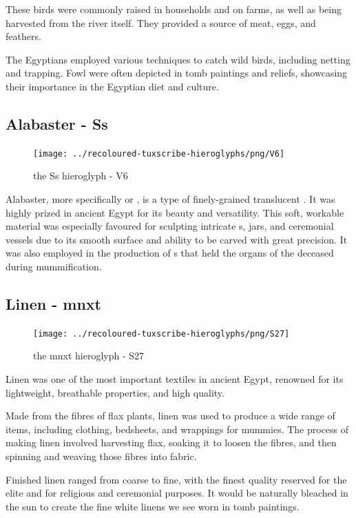 These birds were commonly raised in households and on farms, as well as being harvested from the river itself. They provided a source of meat, eggs, and feathers.

The Egyptians employed various techniques to catch wild birds, including netting and trapping. Fowl were often depicted in tomb paintings and reliefs, showcasing their importance in the Egyptian diet and culture.

\subsection*{Alabaster - Ss}

\begin{figure} [H]
	\centering
	\texttt{[image: ../recoloured-tuxscribe-hieroglyphs/png/V6]}
	\caption{the Ss hieroglyph - V6}
\end{figure}

Alabaster, more specifically   or , is a type of finely-grained translucent . It was highly prized in ancient Egypt for its beauty and versatility. This soft, workable material was especially favoured for sculpting intricate s, jars, and ceremonial vessels due to its smooth surface and ability to be carved with great precision. It was also employed in the production of s that held the organs of the deceased during mummification.

\subsection*{Linen - mnxt}

\begin{figure} [H]
	\centering
	\texttt{[image: ../recoloured-tuxscribe-hieroglyphs/png/S27]}
	\caption{the mnxt hieroglyph - S27}
\end{figure}

Linen was one of the most important textiles in ancient Egypt, renowned for its lightweight, breathable properties, and high quality.

Made from the fibres of flax plants, linen was used to produce a wide range of items, including clothing, bedsheets, and wrappings for mummies. The process of making linen involved harvesting flax, soaking it to loosen the fibres, and then spinning and weaving those fibres into fabric.

Finished linen ranged from coarse to fine, with the finest quality reserved for the elite and for religious and ceremonial purposes. It would be naturally bleached in the sun to create the fine white linens we see worn in tomb paintings.

